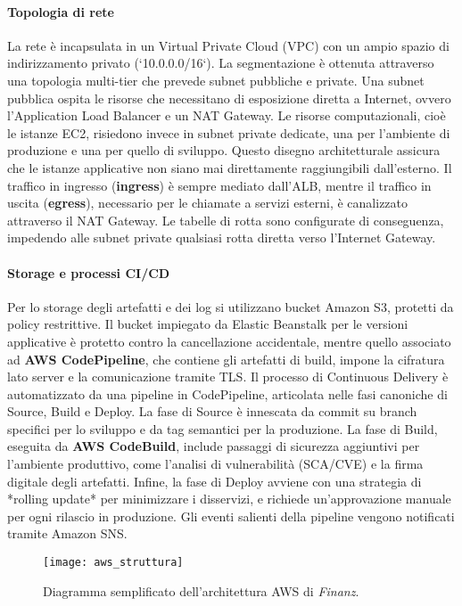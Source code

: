 \paragraph{Topologia di rete}
La rete è incapsulata in un Virtual Private Cloud (VPC) con un ampio spazio di indirizzamento privato (`10.0.0.0/16`). La segmentazione è ottenuta attraverso una topologia multi-tier che prevede subnet pubbliche e private. Una subnet pubblica ospita le risorse che necessitano di esposizione diretta a Internet, ovvero l'Application Load Balancer e un NAT Gateway. Le risorse computazionali, cioè le istanze EC2, risiedono invece in subnet private dedicate, una per l'ambiente di produzione e una per quello di sviluppo. Questo disegno architetturale assicura che le istanze applicative non siano mai direttamente raggiungibili dall'esterno. Il traffico in ingresso (\textbf{ingress}) è sempre mediato dall'ALB, mentre il traffico in uscita (\textbf{egress}), necessario per le chiamate a servizi esterni, è canalizzato attraverso il NAT Gateway. Le tabelle di rotta sono configurate di conseguenza, impedendo alle subnet private qualsiasi rotta diretta verso l'Internet Gateway.

\paragraph{Storage e processi CI/CD}
Per lo storage degli artefatti e dei log si utilizzano bucket Amazon S3, protetti da policy restrittive. Il bucket impiegato da Elastic Beanstalk per le versioni applicative è protetto contro la cancellazione accidentale, mentre quello associato ad \textbf{AWS CodePipeline}, che contiene gli artefatti di build, impone la cifratura lato server e la comunicazione tramite TLS. Il processo di Continuous Delivery è automatizzato da una pipeline in CodePipeline, articolata nelle fasi canoniche di Source, Build e Deploy. La fase di Source è innescata da commit su branch specifici per lo sviluppo e da tag semantici per la produzione. La fase di Build, eseguita da \textbf{AWS CodeBuild}, include passaggi di sicurezza aggiuntivi per l'ambiente produttivo, come l'analisi di vulnerabilità (SCA/CVE) e la firma digitale degli artefatti. Infine, la fase di Deploy avviene con una strategia di *rolling update* per minimizzare i disservizi, e richiede un'approvazione manuale per ogni rilascio in produzione. Gli eventi salienti della pipeline vengono notificati tramite Amazon SNS.


\begin{figure}[htbp]
  \centering
  \texttt{[image: aws\_struttura]}
  \caption{Diagramma semplificato dell’architettura AWS di \textit{Finanz}.}
  \label{fig:aws_struttura_attuale_cap2}
\end{figure}


